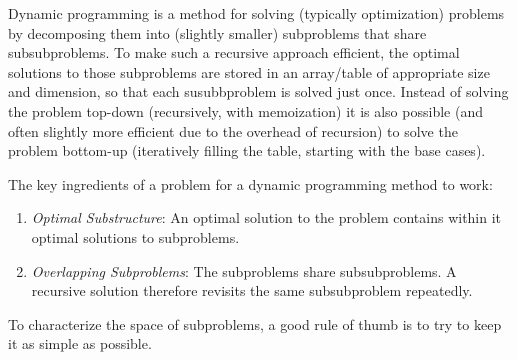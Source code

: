 Dynamic programming is a method for solving (typically optimization) problems by decomposing them into (slightly smaller) subproblems that share subsubproblems.
To make such a recursive approach efficient, the optimal solutions to those subproblems are stored in an array/table of appropriate size and dimension, so that each susubbproblem is solved just once.
Instead of solving the problem top-down (recursively, with memoization) it is also possible (and often slightly more efficient due to the overhead of recursion) to solve the problem bottom-up (iteratively filling the table, starting with the base cases).


The key ingredients of a problem for a dynamic programming method to work:
\begin{enumerate}
  \item \emph{Optimal Substructure}:  \label{optimal_substructure_dp}
  An optimal solution to the problem contains within it optimal solutions to subproblems.
  \item \emph{Overlapping Subproblems}: \label{overlapping_subproblems}
  The subproblems share subsubproblems.
  A recursive solution therefore revisits the same subsubproblem repeatedly.
\end{enumerate}

To characterize the space of subproblems, a good rule of thumb is to try to keep it as simple as possible.

